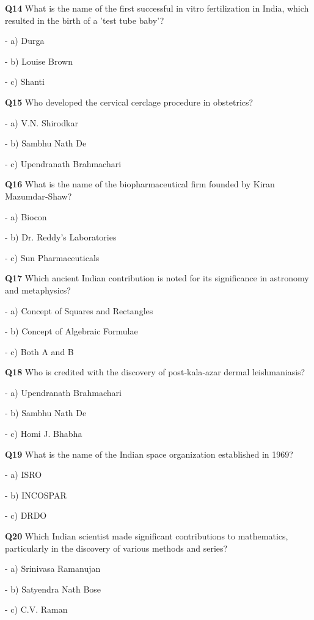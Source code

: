 \textbf{Q14} What is the name of the first successful in vitro fertilization in India, which resulted in the birth of a 'test tube baby'?\par
\quad - a) Durga\par
\quad - b) Louise Brown\par
\quad - c) Shanti\par

\textbf{Q15} Who developed the cervical cerclage procedure in obstetrics?\par
\quad - a) V.N. Shirodkar\par
\quad - b) Sambhu Nath De\par
\quad - c) Upendranath Brahmachari\par

\textbf{Q16} What is the name of the biopharmaceutical firm founded by Kiran Mazumdar‑Shaw?\par
\quad - a) Biocon\par
\quad - b) Dr. Reddy's Laboratories\par
\quad - c) Sun Pharmaceuticals\par

\textbf{Q17} Which ancient Indian contribution is noted for its significance in astronomy and metaphysics?\par
\quad - a) Concept of Squares and Rectangles\par
\quad - b) Concept of Algebraic Formulae\par
\quad - c) Both A and B\par

\textbf{Q18} Who is credited with the discovery of post‑kala‑azar dermal leishmaniasis?\par
\quad - a) Upendranath Brahmachari\par
\quad - b) Sambhu Nath De\par
\quad - c) Homi J. Bhabha\par

\textbf{Q19} What is the name of the Indian space organization established in 1969?\par
\quad - a) ISRO\par
\quad - b) INCOSPAR\par
\quad - c) DRDO\par

\textbf{Q20} Which Indian scientist made significant contributions to mathematics, particularly in the discovery of various methods and series?\par
\quad - a) Srinivasa Ramanujan\par
\quad - b) Satyendra Nath Bose\par
\quad - c) C.V. Raman\par


